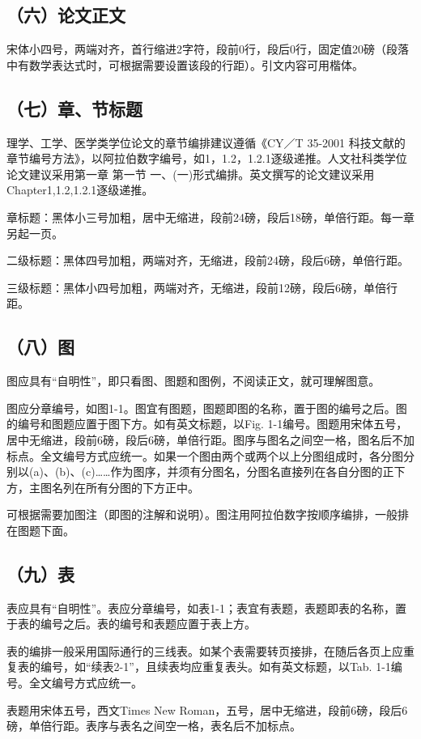 \subsection{（六）论文正文}
宋体小四号，两端对齐，首行缩进2字符，段前0行，段后0行，固定值20磅（段落中有数学表达式时，可根据需要设置该段的行距）。引文内容可用楷体。

\subsection{（七）章、节标题}
理学、工学、医学类学位论文的章节编排建议遵循《CY／T 35-2001 科技文献的章节编号方法》，以阿拉伯数字编号，如1，1.2，1.2.1逐级递推。人文社科类学位论文建议采用第一章 第一节 一、(一)形式编排。英文撰写的论文建议采用Chapter1,1.2,1.2.1逐级递推。

章标题：黑体小三号加粗，居中无缩进，段前24磅，段后18磅，单倍行距。每一章另起一页。

二级标题：黑体四号加粗，两端对齐，无缩进，段前24磅，段后6磅，单倍行距。

三级标题：黑体小四号加粗，两端对齐，无缩进，段前12磅，段后6磅，单倍行距。

\subsection{（八）图}
图应具有“自明性”，即只看图、图题和图例，不阅读正文，就可理解图意。

图应分章编号，如图1-1。图宜有图题，图题即图的名称，置于图的编号之后。图的编号和图题应置于图下方。如有英文标题，以Fig. 1-1编号。图题用宋体五号，居中无缩进，段前6磅，段后6磅，单倍行距。图序与图名之间空一格，图名后不加标点。全文编号方式应统一。如果一个图由两个或两个以上分图组成时，各分图分别以(a)、(b)、(c)……作为图序，并须有分图名，分图名直接列在各自分图的正下方，主图名列在所有分图的下方正中。

可根据需要加图注（即图的注解和说明）。图注用阿拉伯数字按顺序编排，一般排在图题下面。

\subsection{（九）表}
表应具有“自明性”。表应分章编号，如表1-1；表宜有表题，表题即表的名称，置于表的编号之后。表的编号和表题应置于表上方。

表的编排一般采用国际通行的三线表。如某个表需要转页接排，在随后各页上应重复表的编号，如“续表2-1”，且续表均应重复表头。如有英文标题，以Tab. 1-1编号。全文编号方式应统一。

表题用宋体五号，西文Times New Roman，五号，居中无缩进，段前6磅，段后6磅，单倍行距。表序与表名之间空一格，表名后不加标点。

